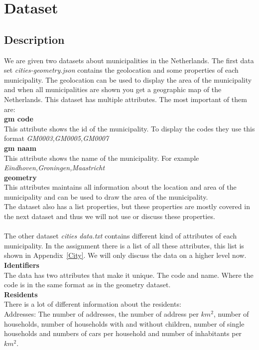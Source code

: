 \section{Dataset}\label{Sec:Dat}
\subsection{Description}
We are given two datasets about municipalities in the Netherlands. The first data set \emph{cities-geometry.json} contains the geolocation and some properties of each municipality. The geolocation can be used to display the area of the municipality and when all municipalities are shown you get a geographic map of the Netherlands. This dataset has multiple attributes. The most important of them are:\\
\textbf{gm code} \\
This attribute shows the id of the municipality. To display the codes they use this format \emph{GM0003,GM0005,GM0007}\\
\textbf{gm naam} \\
This attribute shows the name of the municipality. For example \emph{Eindhoven,Groningen,Maastricht} \\
\textbf{geometry} \\
This attributes maintains all information about the location and area of the municipality and can be used to draw the area of the municipality. \\
The dataset also has a list properties, but these properties are mostly covered in the next dataset and thus we will not use or discuss these properties. \\ \\
 The other dataset \emph{ cities data.txt}  contains different kind of attributes of each municipality. In the assignment there is a list of all these attributes, this list is shown in Appendix~\ref{City}. We will only discuss the data on a higher level now. \\
 \textbf{Identifiers} \\
 The data has two attributes that make it unique. The code and name. Where the code  is in the same format as in the geometry dataset. \\
  \textbf{Residents} \\
There is a lot of different information about the residents:\\
Addresses: The number of addresses, the number of address per $km^{2}$, number of households, number of households with and without children, number of single households and numbers of cars per household and number of inhabitants per $km^{2}$. \\
